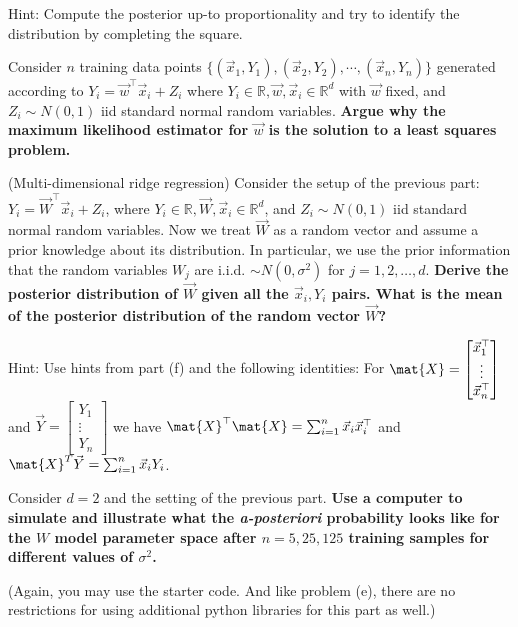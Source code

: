 \documentclass[preview]{standalone}
\begin{document}
\begin{Parts}
Hint: Compute the posterior up-to proportionality and try to identify the distribution
by completing the square.




\Part Consider $n$ training
data points $\{(\vec{x}_1,Y_1),(\vec{x}_2,Y_2),\cdots, (\vec{x}_n,Y_n)\}$ generated
according to $Y_i=\vec w^\top \vec{x}_i+Z_i$ where $Y_i\in\mathbb{R}, \vec{w}, \vec{x}_i
\in\mathbb{R}^d$ with $\vec w$ fixed, and $Z_i \sim N(0,1)$ iid standard
normal random variables.  {\bf Argue why the maximum likelihood estimator
 for $\vec w$ is the solution to a least squares problem.} 





\Part (Multi-dimensional ridge regression) Consider the setup of the
previous part: $Y_i= \vec{W}^\top \vec{x}_i+Z_i$, where $Y_i\in\mathbb{R}, 
\vec{W}, \vec{x}_i \in\mathbb{R}^d$, and $Z_i \sim N(0,1)$ iid standard
normal random variables. Now we treat $\vec{W}$ as a random vector
and assume a prior knowledge about its distribution.
In particular, we use the prior information that the random variables $W_j$
are i.i.d. $\sim N(0,\sigma^2)$ for $j=1,2,\ldots,d$.  
{\bf Derive the posterior distribution of $\vec{W}$ given all the $\vec{x}_i,Y_i$ pairs. 
What is the mean of the posterior distribution of the random vector $\vec{W}$?} 

Hint: Use hints from part (f) and the following identities:
For $\mat{X} = \begin{bmatrix}
  \vec {x}_1^\top  \\ \vdots \\ \vec{x}_n^\top
\end{bmatrix} $ and $\vec{Y} = \begin{bmatrix}
  Y_1 \\ \vdots \\ Y_n
\end{bmatrix}$
we have $\mat{X}^\top \mat{X} = \sum_{i=1}^n \vec{x}_i\vec{x}_i^\top $ and 
$\mat{X}^T \vec{Y} = \sum_{i=1}^n \vec{x}_i Y_i$.



\Part Consider $d=2$ and the setting of the previous part. {\bf Use a
  computer to simulate and illustrate what the {\em a-posteriori}
  probability looks like for the $W$ model parameter space after $n=5,
  25, 125$ training samples for different values of
  $\sigma^2$. } 

(Again, you may use the starter code. And like problem (e), there are
no restrictions for using additional python libraries for this
part as well.)  



\end{Parts}
\end{document}
